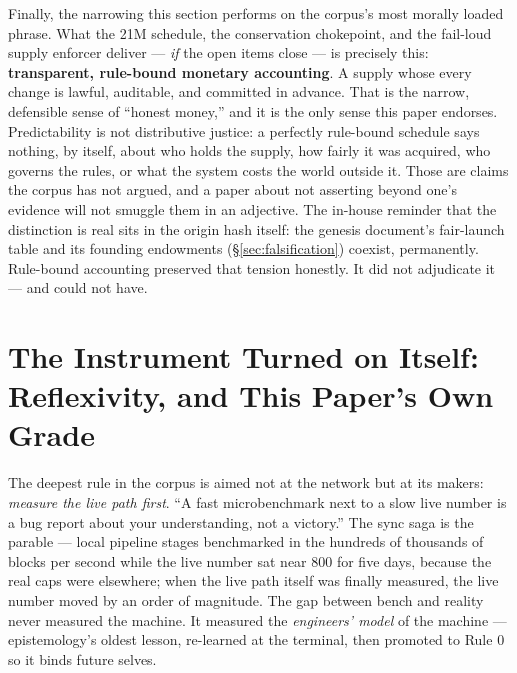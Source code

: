 \documentclass[10pt,a4paper]{article}
\begin{document}
Finally, the narrowing this section performs on the corpus's most morally loaded
phrase. What the 21M schedule, the conservation chokepoint, and the fail-loud
supply enforcer deliver — \emph{if} the open items close — is precisely this:
\textbf{transparent, rule-bound monetary accounting}. A supply whose every change
is lawful, auditable, and committed in advance. That is the narrow, defensible
sense of ``honest money,'' and it is the only sense this paper endorses.
Predictability is not distributive justice: a perfectly rule-bound schedule says
nothing, by itself, about who holds the supply, how fairly it was acquired, who
governs the rules, or what the system costs the world outside it. Those are
claims the corpus has not argued, and a paper about not asserting beyond one's
evidence will not smuggle them in an adjective. The in-house reminder that the
distinction is real sits in the origin hash itself: the genesis document's
fair-launch table and its founding endowments (\S\ref{sec:falsification})
coexist, permanently. Rule-bound accounting preserved that tension honestly. It
did not adjudicate it — and could not have.

\section{The Instrument Turned on Itself: Reflexivity, and This Paper's Own Grade}\label{sec:reflexive}

The deepest rule in the corpus is aimed not at the network but at its makers:
\emph{measure the live path first}. ``A fast microbenchmark next to a slow live
number is a bug report about your understanding, not a victory.'' The sync saga is
the parable — local pipeline stages benchmarked in the hundreds of thousands of
blocks per second while the live number sat near 800 for five days, because the
real caps were elsewhere; when the live path itself was finally measured, the live
number moved by an order of magnitude. The gap between bench and reality never
measured the machine. It measured the \emph{engineers' model} of the machine —
epistemology's oldest lesson, re-learned at the terminal, then promoted to Rule 0
so it binds future selves.
\end{document}
